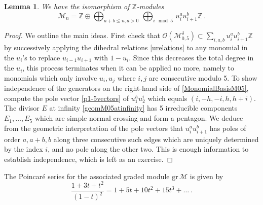 \documentclass[a4paper,10pt]{amsart}
\newtheorem{lem}[thm]{Lemma}
\theoremstyle{definition}
\theoremstyle{remark}
\numberwithin{equation}{section}
\newcommand{\Z}{\mathbb Z}
\newcommand{\0}{\color{blue}{\mathsf{0}}}
\begin{document}
\begin{lem} We have the isomorphism of $\Z$-modules
\begin{equation} \label{MonomialBasisM05}  \mathcal{M}_n  = \Z \oplus  \bigoplus_{a+b\leq n , a>0}  \, \bigoplus_{i \!\!\!\!\!\mod 5} \,    u^a_{i} u^b_{i+1}  \Z \ .  
\end{equation}
\end{lem}
\begin{proof} We outline the main ideas. First check that $\mathcal{O}(\mathcal{M}_{0,5}^{\delta}) \subset \sum_{i,a,b} u_i^a u_{i+1}^b \Z$ by successively applying  the dihedral relations \eqref{urelations} to any monomial in the $u_i$'s to replace $u_{i-1} u_{i+1}$ with $1- u_i$. Since this decreases the total degree in the $u_i$,  this process terminates when it can be applied no more, namely to monomials which only involve $u_i, u_j$ where $i,j$ are consecutive modulo 5. To show independence of the generators on the right-hand side of \eqref{MonomialBasisM05}, compute the pole vector \eqref{p1-5vectors} of $u_1^h u_2^i$ which equals $(i,-h,-i,h,h+i)$. The divisor  $E$ at infinity \eqref{geomM05atinfinity} has 5 irreducible components $E_1,\ldots, E_5$ which are simple normal crossing and form a pentagon. 
We deduce  from the geometric interpretation of the pole vectors \cite{BrENS} that $u_i^{a} u_{i+1}^b$ has  poles of order $a,a+b,b$ along three consecutive such edges which are uniquely determined by the index $i$, and no pole along the other two. This is enough information to establish independence, which is left as an exercise.
\end{proof} 
The  Poincar\'e series for the associated graded module $\mathrm{gr} \,\mathcal{M}$ is given by 
\begin{equation} \label{PoincareSeriesgrM}  \frac{1+3t+t^2}{(1-t)^2} =1 + 5 t + 10 t^2 +15 t^3 +\ldots \ .
\end{equation} 
\end{document}
